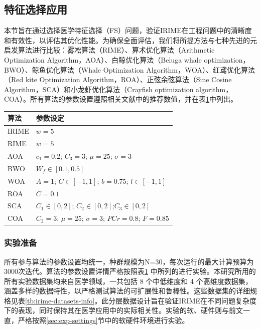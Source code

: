 \documentclass{wzuthesis}
\begin{document}
\subsection{特征选择应用}
本节旨在通过选择医学特征选择（FS）问题，验证IRIME在工程问题中的清晰度和有效性，以评估其优化性能。为确保全面评估，我们将所提方法与七种先进的元启发算法进行比较：雾凇算法（RIME）、算术优化算法（Arithmetic Optimization Algorithm，AOA）、白鲸优化算法（Beluga whale optimization，BWO）、鲸鱼优化算法（Whale Optimization Algorithm，WOA）、红鸢优化算法（Red kite Optimization Algorithm，ROA）、正弦余弦算法（Sine Cosine Algorithm，SCA）和小龙虾优化算法（Crayfish optimization algorithm，COA）。所有算法的参数设置遵照相关文献中的推荐数值，并在表\ref{tb:FS-alg-parameters-2}中列出。
\begin{table}[htbp]
\centering
\small
{}
\begin{tabular}{ll}
\toprule
\textbf{算法} & \textbf{参数设定} \\
\midrule
IRIME & $w = 5$ \\
RIME & $w=5$ \\
AOA & $c_1 = 0.2$; $C_3 = 3$; $\mu = 25$; $\sigma = 3$\\
BWO & $W_f \in [0.1,0.5]$\\
WOA & $A = 1$; $C \in [-1,1]$; $b = 0.75$; $l \in [-1,1]$\\
ROA & $C = 0.1$\\
SCA & $C_1 \in [0,2]$; $C_2 \in [0,2]$;$C_3 \in [0,2]$\\
COA & $C_3 = 3$; $\mu = 25$; $\sigma = 3$; $PCr = 0.8$; $F = 0.85$\\
\bottomrule
\end{tabular}
\label{tb:FS-alg-parameters-2}
\end{table}

\subsubsection{实验准备}
所有参与算法的参数设置均统一，种群规模为N=30，每次运行的最大计算预算为3000次迭代。算法的参数设置详情严格按照表\ref{tb:FS-alg-parameters-2} 中所列的进行实验。本研究所用的所有实验数据集均来自医学领域，一共包括 8 个中低维度和 4 个高维度数据集，涵盖多样的数据特性，以严格测试算法的可扩展性和鲁棒性。这些数据集的详细规格见表\ref{tb:irime-datasets-info}。此分层数据设计旨在验证IRIME在不同问题复杂度下的表现，同时保持其在医学应用中的实际相关性。实验的软、硬件则与前文一直，严格按照\ref{sec:exp-settings}节中的软硬件环境进行实验。
\end{document}
